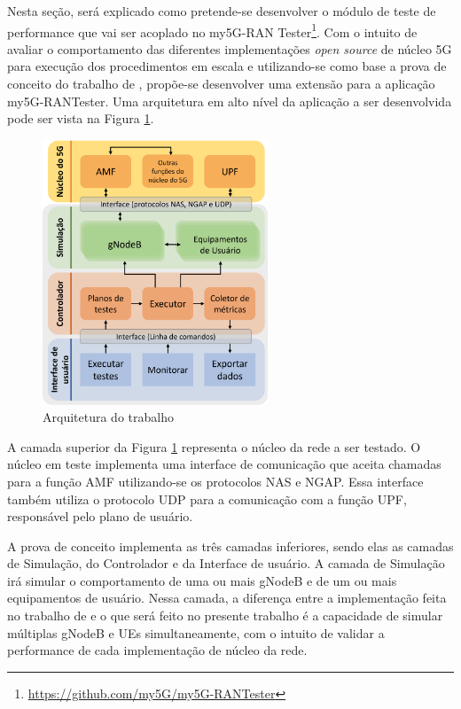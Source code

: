 Nesta seção, será explicado como pretende-se desenvolver o módulo de teste de performance que vai ser acoplado no my5G-RAN Tester\footnote{\url{https://github.com/my5G/my5G-RANTester}}.
Com o intuito de avaliar o comportamento das diferentes implementações \textit{open source} de núcleo 5G para execução dos procedimentos em escala e utilizando-se como base a prova de conceito do trabalho de \cite{Dominato2021}, propõe-se desenvolver uma extensão para a aplicação my5G-RANTester.
Uma arquitetura em alto nível da aplicação a ser desenvolvida pode ser vista na Figura \ref{fig:tester_arch}.

\begin{figure}
    \centering
    \includegraphics[width=0.6\textwidth]{TG1/Images/TesterArchtectureV2.png}
    \caption{Arquitetura do trabalho}
    \label{fig:tester_arch}
\end{figure}

A camada superior da Figura \ref{fig:tester_arch} representa o núcleo da rede a ser testado. O núcleo em teste implementa uma interface de comunicação que aceita chamadas para a função AMF utilizando-se os protocolos NAS e NGAP. Essa interface também utiliza o protocolo UDP para a comunicação com a função UPF, responsável pelo plano de usuário.

A prova de conceito implementa as três camadas inferiores, sendo elas as camadas de Simulação, do Controlador e da Interface de usuário.
A camada de Simulação irá simular o comportamento de uma ou mais gNodeB e de um ou mais equipamentos de usuário.
Nessa camada, a diferença entre a implementação feita no trabalho de \cite{Dominato2021} e o que será feito no presente trabalho é a capacidade de simular múltiplas gNodeB e UEs simultaneamente, com o intuito de validar a performance de cada implementação de núcleo da rede.

